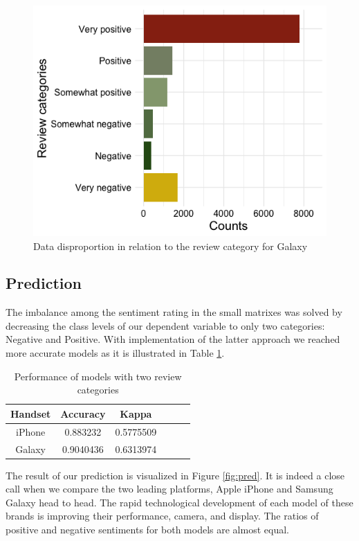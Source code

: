 \documentclass[12]{article}
\begin{document}
\begin{figure}[H]
\centering
\includegraphics[scale=0.5]{imbB.png}
\centering
\caption{Data disproportion in relation to the review category for Galaxy}
\label{fig:imbB}
\end{figure}


\newpage
\subsection{Prediction}
The imbalance among the sentiment rating in the small matrixes was solved by decreasing the class levels of our dependent variable to only two categories: Negative and Positive. With implementation of the latter approach we reached more accurate models as it is illustrated in Table \ref{tab:Comp3}.

\begin{table}[H]
\center
\begin{tabular}{c c c c c c}
\hline 
Handset & Accuracy & Kappa \\ 
\hline \hline
iPhone &  0.883232 & 0.5775509 \\ 
Galaxy & 0.9040436 & 0.6313974 \\ 
\hline
\end{tabular} 
\caption{Performance of models with two review categories}
\label{tab:Comp3}
\end{table}

The result of our prediction is visualized in Figure \ref{fig:pred}. It is indeed a close call when we compare the two leading platforms, Apple iPhone and Samsung Galaxy head to head. The rapid technological development of each model of these brands is improving their performance, camera, and display. The ratios of positive and negative sentiments for both models are almost equal.
\end{document}
